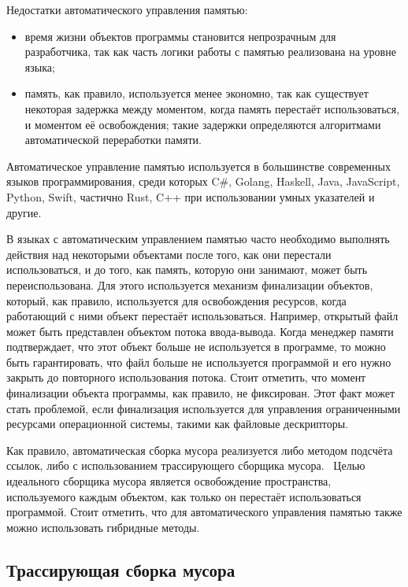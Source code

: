 Недостатки автоматического управления памятью: 

\begin{itemize}[label*=---]
	\item время жизни объектов программы становится непрозрачным для разработчика, так как часть логики работы с памятью реализована на уровне языка;
	\item память, как правило, используется менее экономно, так как существует некоторая задержка между моментом, когда память перестаёт использоваться, и моментом её освобождения; такие задержки определяются алгоритмами автоматической переработки памяти.
\end{itemize}

Автоматическое управление памятью используется в большинстве современных языков программирования, среди которых C\#, Golang, Haskell, Java, JavaScript, Python, Swift, частично Rust, C++ при использовании умных указателей и другие.

В языках с автоматическим управлением памятью часто необходимо выполнять действия над некоторыми объектами после того, как они перестали использоваться, и до того, как память, которую они занимают, может быть переиспользована. Для этого используется механизм финализации объектов, который, как правило, используется для освобождения ресурсов, когда работающий с ними объект перестаёт использоваться. Например, открытый файл может быть представлен объектом потока ввода-вывода. Когда менеджер памяти подтверждает, что этот объект больше не используется в программе, то можно быть гарантировать, что файл больше не используется программой и его нужно закрыть до повторного использования потока. Стоит отметить, что момент финализации объекта программы, как правило, не фиксирован. Этот факт может стать проблемой, если финализация используется для управления ограниченными ресурсами операционной системы, такими как файловые дескрипторы.~\cite{glossary}

Как правило, автоматическая сборка мусора реализуется либо методом подсчёта ссылок, либо с использованием трассирующего сборщика мусора.~\cite{recycling} Целью идеального сборщика мусора является освобождение пространства, используемого каждым объектом, как только он перестаёт использоваться программой. Стоит отметить, что для автоматического управления памятью также можно использовать гибридные методы.~\cite{cornell2}~\cite{urc}

\subsection{Трассирующая сборка мусора}
\label{tracing}

